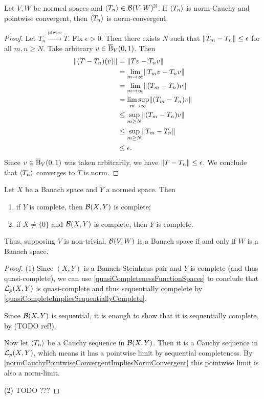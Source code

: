 \begin{lemma} \label{normCauchyPointwiseConvergentImpliesNormConvergent}
Let $V,W$ be normed spaces and $\left\langle T_n \right\rangle\in\operatorname{\mathcal{B}}(V,W)^{\mathbb{N}}$. If $\left\langle T_n \right\rangle$ is norm-Cauchy and pointwise convergent, then $\left\langle T_n \right\rangle$ is norm-convergent.
\end{lemma}
\begin{proof}
Let $T_n\overset{\text{ptwise}}{\longrightarrow} T$. Fix $\epsilon > 0$. Then there exists $N$ such that $\lVert T_m-T_n\rVert\leq \epsilon$ for all $m,n\geq N$. Take arbitrary $v\in \operatorname{\overline{B}}_V(0,1)$. Then
\begin{align*}
\lVert(T-T_n)(v)\rVert &= \lVert Tv - T_nv\rVert \\
&= \lim_{m\to\infty}\lVert T_mv-T_nv\rVert \\
&= \lim_{m\to\infty}\lVert(T_m-T_n)v\rVert \\
&= \limsup_{m\to\infty}\lVert(T_m-T_n)v\rVert \\
&\leq \sup_{m\geq N}\lVert(T_m-T_n)v\rVert \\
&\leq \sup_{m\geq N}\lVert T_m-T_n\rVert \\
&\leq \epsilon.
\end{align*}
Since $v\in \operatorname{\overline{B}}_V(0,1)$ was taken arbitrarily, we have $\lVert T-T_n\rVert \leq \epsilon$. We conclude that $\left\langle T_n \right\rangle$ converges to $T$ is norm.
\end{proof}

\begin{proposition} \label{boundedOperatorsFormBanachSpace}
Let $X$ be a Banach space and $Y$ a normed space. Then
\begin{enumerate}
\item if $Y$ is complete, then $\operatorname{\mathcal{B}}(X,Y)$ is complete;
\item if $X\neq \{0\}$ and $\operatorname{\mathcal{B}}(X,Y)$ is complete, then $Y$ is complete.
\end{enumerate}
\end{proposition}
Thus, supposing $V$ is non-trivial, $\operatorname{\mathcal{B}}(V,W)$ is a Banach space \textup{if and only if} $W$ is a Banach space.
\begin{proof}
(1) Since $(X,Y)$ is a Banach-Steinhaus pair and $Y$ is complete (and thus quasi-complete), we can use \ref{quasiCompletenessFunctionSpaces} to conclude that $\operatorname{\mathcal{L}}_p(X,Y)$ is quasi-complete and thus sequentially compelete by \ref{quasiCompleteImpliesSequentiallyComplete}.

Since $\operatorname{\mathcal{B}}(X,Y)$ is sequential, it is enough to show that it is sequentially complete, by (TODO ref!).

Now let $\left\langle T_n \right\rangle$ be a Cauchy sequence in $\operatorname{\mathcal{B}}(X,Y)$. Then it is a Cauchy sequence in  $\operatorname{\mathcal{L}}_p(X,Y)$, which means it has a pointwise limit by sequential completeness. By \ref{normCauchyPointwiseConvergentImpliesNormConvergent} this pointwise limit is also a norm-limit.

(2) TODO ???
\end{proof}



